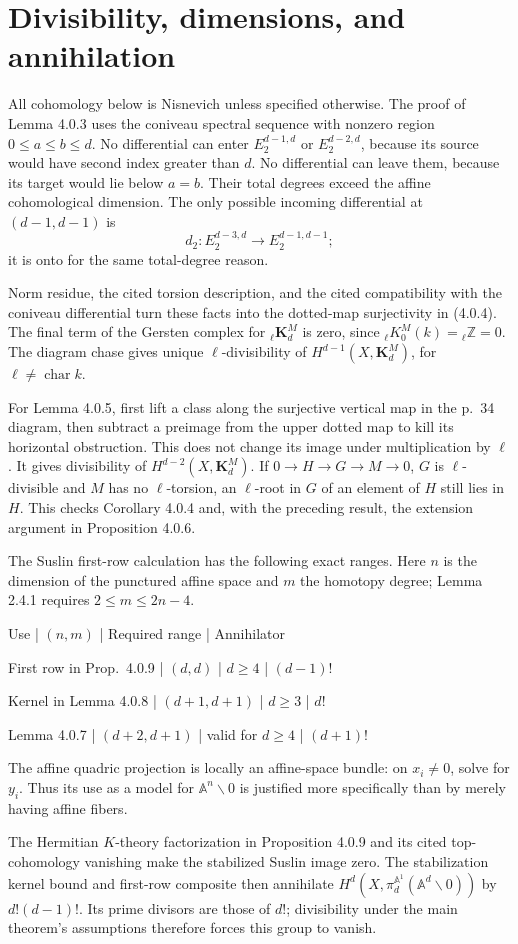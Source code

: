 \documentclass[10pt]{article}
\begin{document}
\section*{Divisibility, dimensions, and annihilation}
All cohomology below is Nisnevich unless specified otherwise. The proof of Lemma 4.0.3 uses the coniveau spectral sequence with nonzero region \(0\leq a\leq b\leq d\). No differential can enter \(E_2^{d-1,d}\) or \(E_2^{d-2,d}\), because its source would have second index greater than \(d\). No differential can leave them, because its target would lie below \(a=b\). Their total degrees exceed the affine cohomological dimension. The only possible incoming differential at \((d-1,d-1)\) is \[d_2:E_2^{d-3,d}\longrightarrow E_2^{d-1,d-1};\] it is onto for the same total-degree reason.\par
Norm residue, the cited torsion description, and the cited compatibility with the coniveau differential turn these facts into the dotted-map surjectivity in (4.0.4). The final term of the Gersten complex for \({}_\ell\mathbf K_d^M\) is zero, since \({}_\ell K_0^M(k)={}_\ell\mathbb Z=0\). The diagram chase gives unique \(\ell\)-divisibility of \(H^{d-1}(X,\mathbf K_d^M)\), for \(\ell\ne\operatorname{char}k\).\par
For Lemma 4.0.5, first lift a class along the surjective vertical map in the p. 34 diagram, then subtract a preimage from the upper dotted map to kill its horizontal obstruction. This does not change its image under multiplication by \(\ell\). It gives divisibility of \(H^{d-2}(X,\mathbf K_d^M)\). If \(0\to H\to G\to M\to0\), \(G\) is \(\ell\)-divisible and \(M\) has no \(\ell\)-torsion, an \(\ell\)-root in \(G\) of an element of \(H\) still lies in \(H\). This checks Corollary 4.0.4 and, with the preceding result, the extension argument in Proposition 4.0.6.\par
The Suslin first-row calculation has the following exact ranges. Here \(n\) is the dimension of the punctured affine space and \(m\) the homotopy degree; Lemma 2.4.1 requires \(2\leq m\leq2n-4\).\par
Use | \((n,m)\) | Required range | Annihilator\par
First row in Prop. 4.0.9 | \((d,d)\) | \(d\geq4\) | \((d-1)!\)\par
Kernel in Lemma 4.0.8 | \((d+1,d+1)\) | \(d\geq3\) | \(d!\)\par
Lemma 4.0.7 | \((d+2,d+1)\) | valid for \(d\geq4\) | \((d+1)!\)\par
The affine quadric projection is locally an affine-space bundle: on \(x_i\ne0\), solve for \(y_i\). Thus its use as a model for \(\mathbb A^n\smallsetminus0\) is justified more specifically than by merely having affine fibers.\par
The Hermitian \(K\)-theory factorization in Proposition 4.0.9 and its cited top-cohomology vanishing make the stabilized Suslin image zero. The stabilization kernel bound and first-row composite then annihilate \(H^d(X,\pi^{\mathbb A^1}_d(\mathbb A^d\smallsetminus0))\) by \(d!(d-1)!\). Its prime divisors are those of \(d!\); divisibility under the main theorem’s assumptions therefore forces this group to vanish.\par
\end{document}
